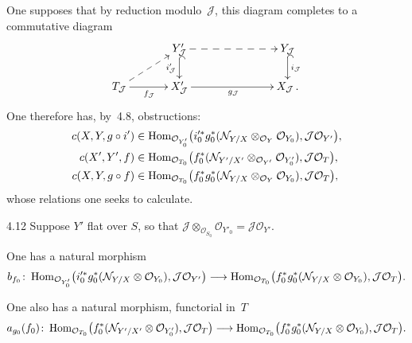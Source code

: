 One supposes that by reduction modulo~\(\mathcal{J}\), this diagram
completes to a commutative diagram
\[
\xymatrix@C=3.4em@R=1.7em{
& Y'_{\mathcal{J}} \ar@{-->}[rr] \ar@{^{(}->}[d]_{i'_{\mathcal{J}}}
& & Y_{\mathcal{J}} \ar@{^{(}->}[d]^{i_{\mathcal{J}}} \\
T_{\mathcal{J}} \ar@{-->}[ur] \ar[r]_{f_{\mathcal{J}}}
& X'_{\mathcal{J}} \ar[rr]_{g_{\mathcal{J}}}
& & X_{\mathcal{J}}\,.
}
\]
One therefore has, by~4.8, obstructions:
\begin{align*}
c(X,Y,g\circ i')
&\in
\operatorname{Hom}_{\mathcal{O}_{Y'_0}}\bigl(
i'^*_0 g^*_0(\mathcal{N}_{Y/X}\otimes_{\mathcal{O}_Y}\mathcal{O}_{Y_0}),
\mathcal{J}\mathcal{O}_{Y'}\bigr),\\
c(X',Y',f)
&\in
\operatorname{Hom}_{\mathcal{O}_{T_0}}\bigl(
f^*_0(\mathcal{N}_{Y'/X'}\otimes_{\mathcal{O}_{Y'}}\mathcal{O}_{Y'_0}),
\mathcal{J}\mathcal{O}_T\bigr),\\
c(X,Y,g\circ f)
&\in
\operatorname{Hom}_{\mathcal{O}_{T_0}}\bigl(
f^*_0 g^*_0(\mathcal{N}_{Y/X}\otimes_{\mathcal{O}_Y}\mathcal{O}_{Y_0}),
\mathcal{J}\mathcal{O}_T\bigr),
\end{align*}
whose relations one seeks to calculate.%
{\renewcommand{\thefootnote}{(99)}}

\begin{lemma}{4.12}\label{III.4.12}
Suppose \(Y'\) flat over \(S\), so that
\(\mathcal{J}\otimes_{\mathcal{O}_{S_0}}\mathcal{O}_{Y'_0}
=\mathcal{J}\mathcal{O}_{Y'}\).
\begin{enumeratei}
\item One has a natural morphism
\[
b_{f_0}\colon
\operatorname{Hom}_{\mathcal{O}_{Y'_0}}\bigl(
i'^*_0 g^*_0(\mathcal{N}_{Y/X}\otimes\mathcal{O}_{Y_0}),
\mathcal{J}\mathcal{O}_{Y'}\bigr)
\longrightarrow
\operatorname{Hom}_{\mathcal{O}_{T_0}}\bigl(
f^*_0 g^*_0(\mathcal{N}_{Y/X}\otimes\mathcal{O}_{Y_0}),
\mathcal{J}\mathcal{O}_T\bigr).
\]
\item One also has a natural morphism, functorial in~\(T\)%
{\renewcommand{\thefootnote}{(100)}}
\[
a_{g_0}(f_0)\colon
\operatorname{Hom}_{\mathcal{O}_{T_0}}\bigl(
f^*_0(\mathcal{N}_{Y'/X'}\otimes\mathcal{O}_{Y'_0}),
\mathcal{J}\mathcal{O}_T\bigr)
\longrightarrow
\operatorname{Hom}_{\mathcal{O}_{T_0}}\bigl(
f^*_0 g^*_0(\mathcal{N}_{Y/X}\otimes\mathcal{O}_{Y_0}),
\mathcal{J}\mathcal{O}_T\bigr).
\]
\end{enumeratei}
\end{lemma}


